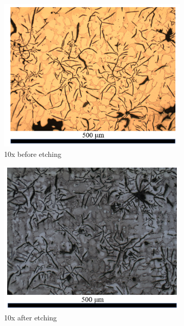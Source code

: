 \documentclass[11pt,a4paper]{article}
\begin{document}
\begin{figure} [ht]
\begin{subfigure}{0.335\textwidth}
\includegraphics[scale=0.6]{10X.png}
\caption{10x before etching}
\end{subfigure}
\begin{subfigure}{0.335\textwidth}
\includegraphics[scale=0.6]{10X_01.png}
\caption{10x after etching}
\label{10_after_etching}
\end{subfigure}
\begin{subfigure}{0.335\textwidth}

\end{subfigure}
\end{figure}
\end{document}
